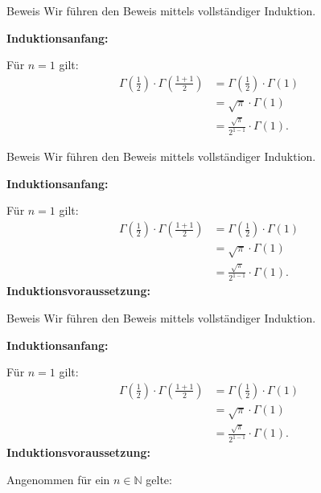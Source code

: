 \documentclass[10pt]{beamer}
\def\bN{\mathbb{N}}
\begin{document}
\begin{frame}{Beweis}
    Wir führen den Beweis mittels vollständiger Induktion.

    \textbf{Induktionsanfang:}

    Für \( n = 1 \) gilt:
    \begin{align*}
        \Gamma\left( \frac{1}{2} \right) \cdot \Gamma\left( \frac{1 + 1}{2} \right)
        & = \Gamma\left( \frac{1}{2} \right) \cdot \Gamma\left( 1 \right) \\
        & = \sqrt{\pi} \cdot \Gamma\left( 1 \right) \\
        & = \frac{\sqrt{\pi}}{2^{1 - 1}} \cdot \Gamma\left( 1 \right).
    \end{align*}
\end{frame}



\begin{frame}{Beweis}
    Wir führen den Beweis mittels vollständiger Induktion.

    \textbf{Induktionsanfang:}

    Für \( n = 1 \) gilt:
    \begin{align*}
        \Gamma\left( \frac{1}{2} \right) \cdot \Gamma\left( \frac{1 + 1}{2} \right)
        & = \Gamma\left( \frac{1}{2} \right) \cdot \Gamma\left( 1 \right) \\
        & = \sqrt{\pi} \cdot \Gamma\left( 1 \right) \\
        & = \frac{\sqrt{\pi}}{2^{1 - 1}} \cdot \Gamma\left( 1 \right).
    \end{align*}
    \textbf{Induktionsvoraussetzung:}
\end{frame}



\begin{frame}{Beweis}
    Wir führen den Beweis mittels vollständiger Induktion.

    \textbf{Induktionsanfang:}

    Für \( n = 1 \) gilt:
    \begin{align*}
        \Gamma\left( \frac{1}{2} \right) \cdot \Gamma\left( \frac{1 + 1}{2} \right)
        & = \Gamma\left( \frac{1}{2} \right) \cdot \Gamma\left( 1 \right) \\
        & = \sqrt{\pi} \cdot \Gamma\left( 1 \right) \\
        & = \frac{\sqrt{\pi}}{2^{1 - 1}} \cdot \Gamma\left( 1 \right).
    \end{align*}
    \textbf{Induktionsvoraussetzung:}

    Angenommen für ein \( n \in \bN \) gelte:
\end{frame}
\end{document}
